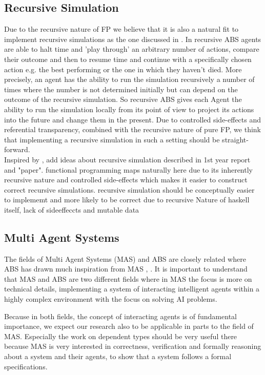 \subsection{Recursive Simulation}
Due to the recursive nature of FP we believe that it is also a natural fit to implement recursive simulations as the one discussed in \cite{gilmer_recursive_2000}. In recursive ABS agents are able to halt time and 'play through' an arbitrary number of actions, compare their outcome and then to resume time and continue with a specifically chosen action e.g. the best performing or the one in which they haven't died. More precisely, an agent has the ability to run the simulation recursively a number of times where the number is not determined initially but can depend on the outcome of the recursive simulation. So recursive ABS gives each Agent the ability to run the simulation locally from its point of view to project its actions into the future and change them in the present. Due to controlled side-effects and referential transparency, combined with the recursive nature of pure FP, we think that implementing a recursive simulation in such a setting should be straight-forward.\\

Inspired by \cite{gilmer_recursive_2000}, add ideas about recursive simulation described in 1st year report and "paper". functional programming maps naturally here due to its inherently recursive nature and controlled side-effects which makes it easier to construct correct recursive simulations.
recursive simulation should be conceptually easier to implememt and more likely to be correct due to recursive Nature of haskell itself, lack of sideeffeccts and mutable data

\subsection{Multi Agent Systems}
The fields of Multi Agent Systems (MAS) and ABS are closely related where ABS has drawn much inspiration from MAS \cite{wooldridge_introduction_2009}, \cite{weiss_multiagent_2013}. It is important to understand that MAS and ABS are two different fields where in MAS the focus is more on technical details, implementing a system of interacting intelligent agents within a highly complex environment with the focus on solving AI problems.

Because in both fields, the concept of interacting agents is of fundamental importance, we expect our research also to be applicable in parts to the field of MAS. Especially the work on dependent types should be very useful there because MAS is very interested in correctness, verification and formally reasoning about a system and their agents, to show that a system follows a formal specifications.
